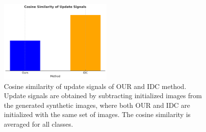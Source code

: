 \documentclass{article}
\theoremstyle{plain}
\theoremstyle{definition}
\theoremstyle{remark}
\begin{document}
\begin{figure}[t]
    \centering
    \includegraphics[width=0.5\textwidth]{./images/loss_cosine.png}
    \caption{Cosine similarity of update signals of OUR and IDC method. Update signals are obtained by subtracting initialized images from the generated synthetic images, where both OUR and IDC are initialized with the same set of images. The cosine similarity is averaged for all classes.}
    \label{fig:training_signal}
\end{figure}
\end{document}

